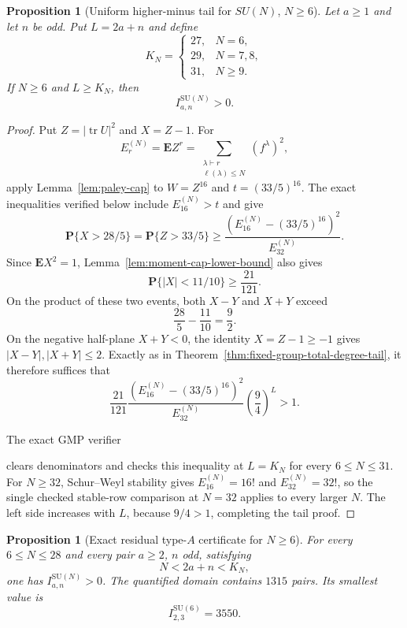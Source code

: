 \documentclass[11pt,reqno]{amsart}
\theoremstyle{plain}
\newtheorem{proposition}[theorem]{Proposition}
\theoremstyle{definition}
\begin{document}
\begin{proposition}[Uniform higher-minus tail for $SU(N)$, $N\geq6$]
\label{prop:sun-ge6-tail}
Let $a\geq1$ and let $n$ be odd.  Put $L=2a+n$ and define
\[
 K_N=
 \begin{cases}
 27,&N=6,\\
 29,&N=7,8,\\
 31,&N\geq9.
 \end{cases}
\]
If $N\geq6$ and $L\geq K_N$, then
\[
 I^{\mathrm{SU}(N)}_{a,n}>0.
\]
\end{proposition}

\begin{proof}
Put $Z=|\operatorname{tr}U|^2$ and $X=Z-1$.  For
\[
 E_r^{(N)}=\mathbf E Z^r
 =\sum_{\substack{\lambda\vdash r\\\ell(\lambda)\leq N}}(f^\lambda)^2,
\]
apply Lemma~\ref{lem:paley-cap} to $W=Z^{16}$ and
$t=(33/5)^{16}$.  The exact inequalities verified below include
$E_{16}^{(N)}>t$ and give
\[
 \mathbf P\{X>28/5\}
 =\mathbf P\{Z>33/5\}
 \geq
 \frac{(E_{16}^{(N)}-(33/5)^{16})^2}{E_{32}^{(N)}}.
\]
Since $\mathbf EX^2=1$, Lemma~\ref{lem:moment-cap-lower-bound} also gives
\[
 \mathbf P\{|X|<11/10\}\geq\frac{21}{121}.
\]
On the product of these two events, both $X-Y$ and $X+Y$ exceed
\[
 \frac{28}{5}-\frac{11}{10}=\frac92.
\]
On the negative half-plane $X+Y<0$, the identity $X=Z-1\geq-1$ gives
$|X-Y|,|X+Y|\leq2$.  Exactly as in
Theorem~\ref{thm:fixed-group-total-degree-tail}, it therefore suffices that
\[
 \frac{21}{121}
 \frac{(E_{16}^{(N)}-(33/5)^{16})^2}{E_{32}^{(N)}}
 \left(\frac94\right)^L>1.
\]

The exact GMP verifier
\begin{center}
\end{center}
clears denominators and checks this inequality at $L=K_N$ for every
$6\leq N\leq31$.  For $N\geq32$, Schur--Weyl stability gives
$E_{16}^{(N)}=16!$ and $E_{32}^{(N)}=32!$, so the single checked stable-row
comparison at $N=32$ applies to every larger $N$.  The left side increases
with $L$, because $9/4>1$, completing the tail proof.
\end{proof}

\begin{proposition}[Exact residual type-$A$ certificate for $N\geq6$]
\label{prop:sun-ge6-residual}
For every $6\leq N\leq28$ and every pair $a\geq2$, $n$ odd, satisfying
\[
 N<2a+n<K_N,
\]
one has $I^{\mathrm{SU}(N)}_{a,n}>0$.  The quantified domain contains
$1315$ pairs.  Its smallest value is
\[
 I^{\mathrm{SU}(6)}_{2,3}=3550.
\]
\end{proposition}
\end{document}
